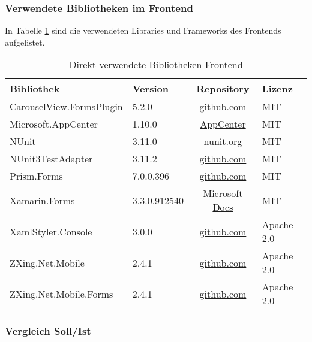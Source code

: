 \subsubsection{Verwendete Bibliotheken im Frontend}
In Tabelle \ref{tab:verwendete-libraries-frontend} sind die verwendeten Libraries und Frameworks des Frontends aufgelistet.
\begin{table}[!h]
	\centering
	\begin{tabular}{| l | l | c | l |}
		\hline
		\textbf{Bibliothek} & \textbf{Version} & \textbf{Repository} & \textbf{Lizenz}\\
		\hline
		CarouselView.FormsPlugin & 5.2.0 & \href{https://github.com/alexrainman/CarouselView}{github.com} & MIT \\
		Microsoft.AppCenter & 1.10.0 & \href{https://visualstudio.microsoft.com/app-center/}{AppCenter} & MIT \\
		NUnit & 3.11.0 & \href{http://nunit.org}{nunit.org} & MIT\\
		NUnit3TestAdapter & 3.11.2 & \href{https://github.com/nunit/docs/wiki/Visual-Studio-Test-Adapter}{github.com} & MIT\\
		Prism.Forms & 7.0.0.396 & \href{https://github.com/PrismLibrary/Prism}{github.com} & MIT \\
		Xamarin.Forms & 3.3.0.912540 & \href{https://docs.microsoft.com/en-us/xamarin/xamarin-forms/}{Microsoft Docs} & MIT \\
		XamlStyler.Console & 3.0.0 & 
		\href{https://github.com/Xavalon/XamlStyler}{github.com} & Apache 2.0\\
		ZXing.Net.Mobile & 2.4.1 & \href{http://github.com/Redth/ZXing.Net.Mobile}{github.com} & Apache 2.0\\
		ZXing.Net.Mobile.Forms & 2.4.1 &
		\href{http://github.com/Redth/ZXing.Net.Mobile}{github.com} & Apache 2.0\\
		\hline
	\end{tabular}
	\caption{Direkt verwendete Bibliotheken Frontend}
	\label{tab:verwendete-libraries-frontend}
\end{table}


\subsubsection{Vergleich Soll/Ist}
